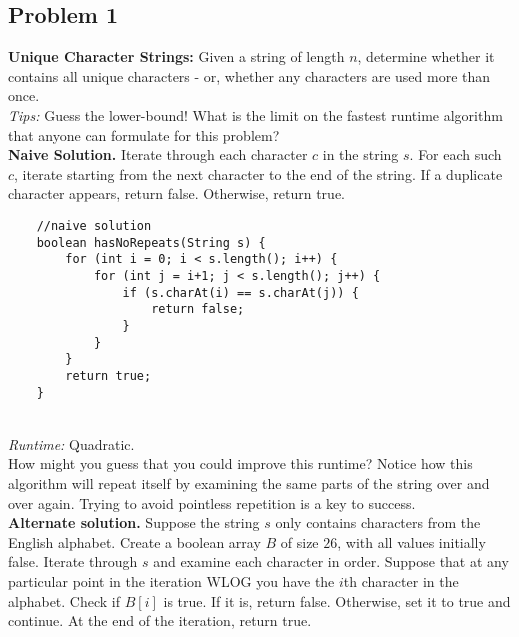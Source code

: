 \newpage

\subsection*{Problem 1} 

\textbf{Unique Character Strings:} Given a string of length $n$, determine whether it contains all unique characters - or, whether any characters are used more than once.\\

\textit{Tips:} Guess the lower-bound! What is the limit on the fastest runtime algorithm that anyone can formulate for this problem?\\

\textbf{Naive Solution.} Iterate through each character $c$ in the string $s$. For each such $c$, iterate starting from the next character to the end of the string. If a duplicate character appears, return false. Otherwise, return true.\\

\begin{verbatim}
    //naive solution
    boolean hasNoRepeats(String s) {
        for (int i = 0; i < s.length(); i++) {
            for (int j = i+1; j < s.length(); j++) {
                if (s.charAt(i) == s.charAt(j)) {
                    return false;
                }
            }
        }
        return true;
    }
\end{verbatim}
\mbox{}\\

\textit{Runtime:} Quadratic.\\

How might you guess that you could improve this runtime? Notice how this algorithm will repeat itself by examining the same parts of the string over and over again. Trying to avoid pointless repetition is a key to success.\\

\textbf{Alternate solution.} Suppose the string $s$ only contains characters from the English alphabet. Create a boolean array $B$ of size $26$, with all values initially false. Iterate through $s$ and examine each character in order. Suppose that at any particular point in the iteration WLOG you have the $i$th character in the alphabet. Check if $B[i]$ is true. If it is, return false. Otherwise, set it to true and continue. At the end of the iteration, return true.\\

